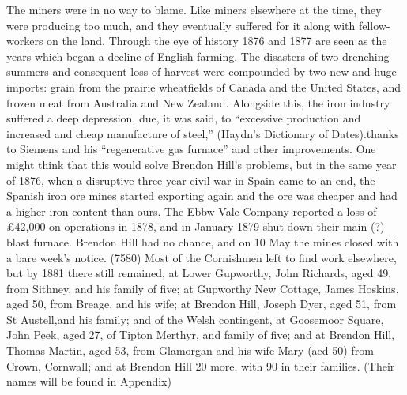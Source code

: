 \documentclass[11pt]{book}
\begin{document}
The miners were in no way to blame. Like miners elsewhere at the time, they were producing too much, and they eventually suffered for it along with fellow-workers on the land.  Through the eye of history 1876 and 1877 are seen as the years which began a decline of English farming. The disasters of two drenching summers and consequent loss of harvest were compounded by two new and huge imports: grain from the prairie wheatfields of Canada and the United States, and frozen meat from Australia and New Zealand. Alongside this, the iron industry suffered a deep depression, due, it was said, to “excessive production and increased and cheap manufacture of steel,” (Haydn’s Dictionary of Dates).thanks to Siemens and his “regenerative gas furnace” and other improvements. One might think that this would solve Brendon Hill’s problems, but in the same year of 1876, when  a disruptive three-year civil war in Spain came to an end, the Spanish iron ore mines started exporting again and the ore was cheaper and had a higher iron content  than ours. The Ebbw Vale Company reported a loss of £42,000 on operations in 1878, and in January 1879 shut down their main (?) blast furnace. Brendon Hill had no chance, and on 10 May the mines closed with a bare week’s notice. (7580) Most of the Cornishmen left to find work elsewhere, but by 1881 there still remained, at Lower Gupworthy, John Richards, aged 49, from Sithney, and his family of five; at Gupworthy New Cottage, James Hoskins, aged 50, from Breage, and his wife; at Brendon Hill, Joseph Dyer, aged 51, from St Austell,and his family; and of the Welsh contingent, at Goosemoor Square, John Peek, aged 27, of Tipton Merthyr, and family of five; and at Brendon Hill, Thomas Martin, aged 53, from Glamorgan and his wife Mary (aed 50) from Crown, Cornwall; and at Brendon Hill 20 more, with 90 in their families. (Their names will be found in Appendix) 
\end{document}
